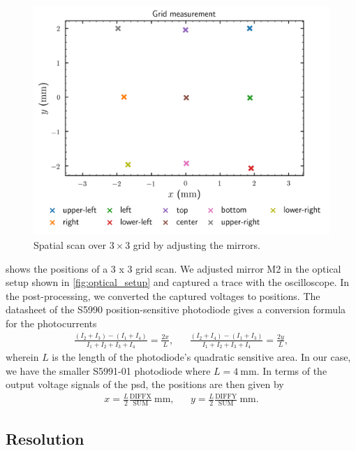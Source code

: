 \begin{figure}[H]
	\centering
	\includegraphics{figure/plot/grid-measurement}
	\caption{Spatial scan over $3\times 3$ grid by adjusting the mirrors.}\label{fig:grid_scan}
\end{figure}
 shows the positions of a 3 x 3 grid scan.
We adjusted mirror M2 in the optical setup shown in \cref{fig:optical_setup} and captured a trace with the oscilloscope.
In the post-processing, we converted the captured voltages to positions.
The datasheet of the S5990 position-sensitive photodiode gives a conversion formula for the photocurrents
\begin{align}
	\frac{(I_2+I_3)-(I_1+I_4)}{I_1+I_2+I_3+I_4}=\frac{2x}{L},
	&&
	\frac{(I_2+I_4)-(I_1+I_3)}{I_1+I_2+I_3+I_4}=\frac{2y}{L}
	\label{eq:position_conversion_photocurrent},
\end{align}
wherein $L$ is the length of the photodiode's quadratic sensitive area.
In our case, we have the smaller S5991-01 photodiode where $L = \SI{4}{\milli\meter}$.
In terms of the output voltage signals of the \gls{psd}, the positions are then given by
\begin{align}
	x=\frac{L}{2}\frac{\text{DIFFX}}{\text{SUM}}\ \si{\milli\meter}, &&
	y=\frac{L}{2}\frac{\text{DIFFY}}{\text{SUM}}\ \si{\milli\meter}.
	\label{eq:position_conversion_voltages}
\end{align}

\subsection{Resolution}

